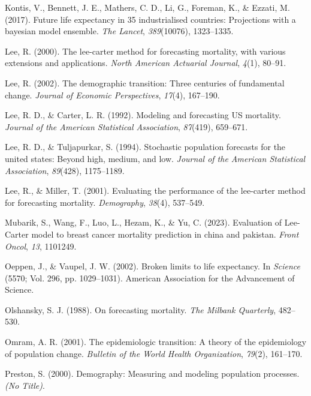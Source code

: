 \documentclass[
  12pt,
]{report}
\newlength{\cslhangindent}
\newenvironment{CSLReferences}[2] %
 {\begin{list}{}{%
  \setlength{\itemindent}{0pt}
  \setlength{\leftmargin}{0pt}
  \setlength{\parsep}{0pt}
  \ifodd #1
   \setlength{\leftmargin}{\cslhangindent}
   \setlength{\itemindent}{-1\cslhangindent}
  \fi
  \setlength{\itemsep}{#2\baselineskip}}}
 {\end{list}}
\begin{document}
\begin{CSLReferences}{1}{0}
Kontis, V., Bennett, J. E., Mathers, C. D., Li, G., Foreman, K., \&
Ezzati, M. (2017). Future life expectancy in 35 industrialised
countries: Projections with a bayesian model ensemble. \emph{The
Lancet}, \emph{389}(10076), 1323--1335.

Lee, R. (2000). The lee-carter method for forecasting mortality, with
various extensions and applications. \emph{North American Actuarial
Journal}, \emph{4}(1), 80--91.

Lee, R. (2002). The demographic transition: Three centuries of
fundamental change. \emph{Journal of Economic Perspectives},
\emph{17}(4), 167--190.

Lee, R. D., \& Carter, L. R. (1992). Modeling and forecasting US
mortality. \emph{Journal of the American Statistical Association},
\emph{87}(419), 659--671.

Lee, R. D., \& Tuljapurkar, S. (1994). Stochastic population forecasts
for the united states: Beyond high, medium, and low. \emph{Journal of
the American Statistical Association}, \emph{89}(428), 1175--1189.

Lee, R., \& Miller, T. (2001). Evaluating the performance of the
lee-carter method for forecasting mortality. \emph{Demography},
\emph{38}(4), 537--549.

Mubarik, S., Wang, F., Luo, L., Hezam, K., \& Yu, C. (2023). Evaluation
of {Lee-Carter} model to breast cancer mortality prediction in china and
pakistan. \emph{Front Oncol}, \emph{13}, 1101249.

Oeppen, J., \& Vaupel, J. W. (2002). Broken limits to life expectancy.
In \emph{Science} (5570; Vol. 296, pp. 1029--1031). American Association
for the Advancement of Science.

Olshansky, S. J. (1988). On forecasting mortality. \emph{The Milbank
Quarterly}, 482--530.

Omram, A. R. (2001). The epidemiologic transition: A theory of the
epidemiology of population change. \emph{Bulletin of the World Health
Organization}, \emph{79}(2), 161--170.

Preston, S. (2000). Demography: Measuring and modeling population
processes. \emph{(No Title)}.


\end{CSLReferences}
\end{document}
